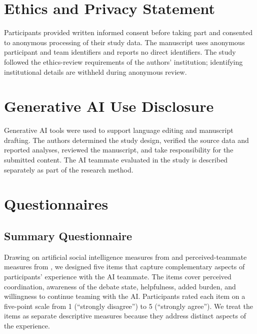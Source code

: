 \documentclass[manuscript,review,anonymous]{acmart}
\begin{document}
\section*{Ethics and Privacy Statement}
Participants provided written informed consent before taking part and consented to anonymous processing of their study data. The manuscript uses anonymous participant and team identifiers and reports no direct identifiers. The study followed the ethics-review requirements of the authors' institution; identifying institutional details are withheld during anonymous review.

\section*{Generative AI Use Disclosure}
Generative AI tools were used to support language editing and manuscript drafting. The authors determined the study design, verified the source data and reported analyses, reviewed the manuscript, and take responsibility for the submitted content. The AI teammate evaluated in the study is described separately as part of the research method.

\appendix

\section{Questionnaires}
\label{app:questionnaires}

\subsection{Summary Questionnaire}
\label{app:summary-quiz}

Drawing on artificial social intelligence measures from \citet{bendell2025asi} and perceived-teammate measures from \citet{mukhopadhyay2026roles}, we designed five items that capture complementary aspects of participants' experience with the AI teammate. The items cover perceived coordination, awareness of the debate state, helpfulness, added burden, and willingness to continue teaming with the AI. Participants rated each item on a five-point scale from 1 (``strongly disagree'') to 5 (``strongly agree''). We treat the items as separate descriptive measures because they address distinct aspects of the experience.
\end{document}
